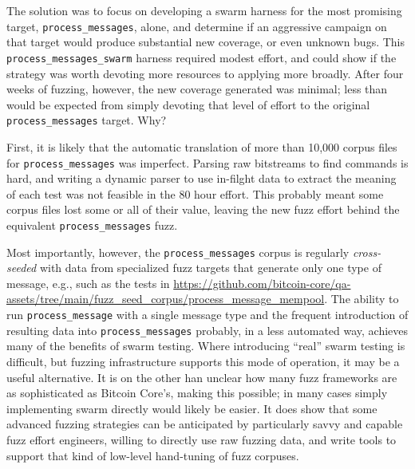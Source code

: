 \begin{sloppypar}
The solution was to focus on developing a swarm harness for the most promising target, {\tt process\_messages}, alone, and determine if an aggressive campaign on that target would produce substantial new coverage, or even unknown bugs. This {\tt process\_messages\_swarm} harness required modest effort, and could show if the strategy was worth devoting more resources to applying more broadly.  After four weeks of fuzzing, however, the new coverage generated was minimal; less than would be expected from simply devoting that level of effort to the original {\tt process\_messages} target.  Why?

First, it is likely that the automatic translation of more than 10,000 corpus files for {\tt process\_messages} was imperfect.  Parsing raw bitstreams to find commands is hard, and writing a dynamic parser to use in-filght data to extract the meaning of each test was not feasible in the 80 hour effort.  This probably meant some corpus files lost some or all of their value, leaving the new fuzz effort behind the equivalent {\tt process\_messages} fuzz.

Most importantly, however, the {\tt process\_messages} corpus is regularly \emph{cross-seeded} with data from specialized fuzz targets that generate only one type of message, e.g., such as the tests in \url{https://github.com/bitcoin-core/qa-assets/tree/main/fuzz_seed_corpus/process\_message\_mempool}.  The ability to run {\tt process\_message} with a single message type and the frequent introduction of resulting data into {\tt process\_messages} probably, in a less automated way, achieves many of the benefits of swarm testing.  Where introducing ``real'' swarm testing is difficult, but fuzzing infrastructure supports this mode of operation, it may be a useful alternative.  It is on the other han unclear how many fuzz frameworks are as sophisticated as Bitcoin Core's, making this possible; in many cases simply implementing swarm directly would likely be easier.  It does show that some advanced fuzzing strategies can be anticipated by particularly savvy and capable fuzz effort engineers, willing to directly use raw fuzzing data, and write tools to support that kind of low-level hand-tuning of fuzz corpuses.

\end{sloppypar}